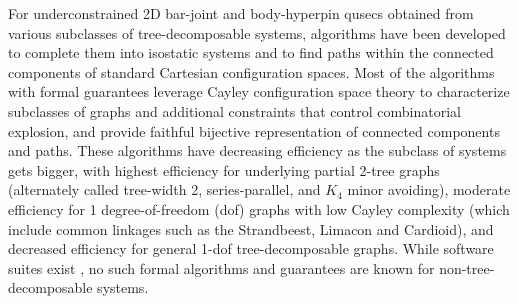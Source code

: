 \medskip\noindent
{}
For underconstrained 2D bar-joint and body-hyperpin qusecs obtained from various subclasses of tree-decomposable systems, algorithms have been developed to complete them into isostatic systems \cite{joan-arinyo2003transforming,sitharam2005combinatorial,gao2006ctree,sitharam2010convex} and to find paths within the connected components \cite{sitharam2011cayleyI,hidalgo2011reachability} of standard Cartesian configuration spaces. Most of the algorithms with formal guarantees leverage Cayley configuration space theory \cite{sitharam2010convex,sitharam2011cayleyI,sitharam2011cayleyII} to characterize subclasses of graphs and additional constraints that control combinatorial explosion, and provide faithful bijective representation of connected components and paths. These algorithms have decreasing efficiency as the subclass of systems gets bigger, with highest efficiency for underlying partial 2-tree graphs (alternately called tree-width 2, series-parallel, and $K_4$ minor avoiding), moderate efficiency for 1 degree-of-freedom (dof) graphs with low Cayley complexity (which include common linkages such as the Strandbeest, Limacon and Cardioid), and decreased efficiency for general 1-dof tree-decomposable graphs. While software suites exist  \cite{keycurriculum1995geometer,porta2014open,siemens1999d,todd2007geometry}, no such formal algorithms and guarantees are known for non-tree-decomposable systems.


